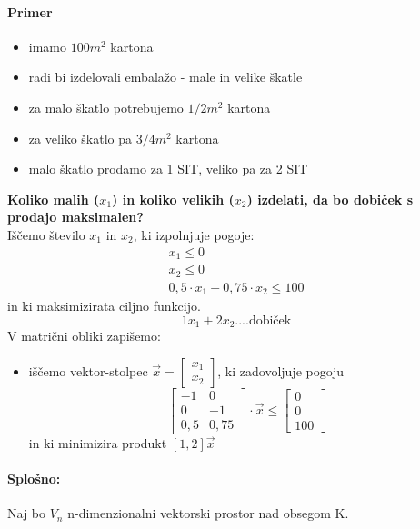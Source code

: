 \documentclass[a4paper,10pt]{article}
\begin{document}
\paragraph{Primer}
\begin{itemize}
\item imamo $100m^2$ kartona
\item radi bi izdelovali embala\v zo - male in velike \v skatle
\item za malo \v skatlo potrebujemo $1/2 m^2$  kartona
\item za veliko \v skatlo pa $3/4 m^2$ kartona
\item malo \v skatlo prodamo za 1 SIT, veliko pa za 2 SIT
\end{itemize}
\textbf{Koliko malih ($x_1$) in koliko velikih ($x_2$) izdelati, da bo dobi\v cek s prodajo maksimalen?}\\
I\v s\v cemo \v stevilo $x_1$ in $x_2$, ki izpolnjuje pogoje:
\begin{eqnarray*}
x_1 \leq 0 \\
x_2 \leq 0 \\
0,5 \cdot x_1 + 0,75 \cdot x_2 \leq 100
\end{eqnarray*}
in ki maksimizirata ciljno funkcijo.
$$1x_1 + 2x_2 \mbox{....dobi\v cek}$$
V matri\v cni obliki zapi\v semo:
\begin{itemize}
\item i\v s\v cemo vektor-stolpec $\vec{x} = \left[
\begin{array}{l}
x_1\\
x_2
\end{array}
 \right] $, ki zadovoljuje pogoju
$$
\left[
\begin{array}{cc}
-1 &	0\\
0 &	-1\\
0,5 &	0,75
\end{array}
\right]
\cdot \vec{x} \leq
\left[
\begin{array}{c}
0\\
0\\
100
\end{array}
\right]
$$
in ki minimizira produkt $\left[ 1, 2 \right] \vec{x}$
\end{itemize}

\paragraph{Splo\v sno:}
Naj bo $V_n$ n-dimenzionalni vektorski prostor nad obsegom K.
\end{document}
